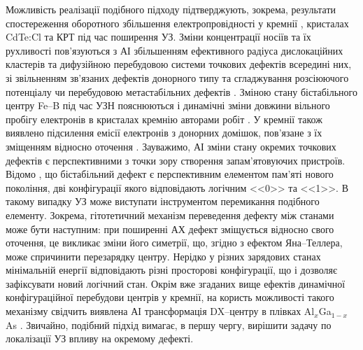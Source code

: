 Можливість реалізації подібного підходу підтверджують, зокрема, результати спостереження оборотного
збільшення електропровідності у кремнії \cite{YOlikhTPL2011r}, кристалах CdTe:Cl \cite{YOlikh:UFG2016,YOlikh:SupMicr} та КРТ \cite{OlikhYFTP99,OlikhYFTP2000} під час поширення УЗ.
Зміни концентрації носіїв та їх рухливості пов'язуються з АІ
збільшенням ефективного радіуса дислокаційних кластерів та дифузійною перебудовою системи точкових дефектів всередині них\cite{YOlikh:UFG2016,YOlikh:SupMicr},
зі звільненням зв'язаних дефектів донорного типу та сгладжування розсіюючого потенціалу \cite{OlikhYFTP99,OlikhYFTP2000}
чи перебудовою метастабільних дефектів \cite{YOlikhTPL2011r}.
Зміною стану бістабільного центру Fe--B під час УЗН пояснюються і динамічні зміни довжини вільного пробігу електронів в кристалах кремнію авторами робіт \cite{Ostrovskii2001,OlikhFTT}.
У кремнії також виявлено підсилення емісії електронів з донорних домішок, пов'язане з їх зміщенням відносно оточення \cite{Korotchenkov1995}.
Зауважимо, АІ зміни стану окремих точкових дефектів є перспективними з точки зору створення запам'ятовуючих пристроїв.
Відомо \cite{MetaUFN}, що бістабільний дефект є перспективним елементом пам'яті нового покоління,
дві конфігурації якого відповідають логічним <<0>> та <<1>>.
В такому випадку УЗ може виступати інструментом перемикання подібного елементу.
Зокрема, гітотетичний механізм переведення дефекту між станами може бути наступним:
при поширенні АХ дефект зміщується відносно свого оточення, це викликає зміни його симетрії, що, згідно з ефектом Яна--Теллера, може спричинити перезарядку центру.
Нерідко у різних зарядових станах мінімальній енергії відповідають різні просторові конфігурації, що і дозволяє зафіксувати новий логічний стан.
Окрім вже згаданих вище ефектів динамічної конфігураційної перебудови центрів у кремнії, на користь
можливості такого механізму свідчить виявлена АІ трансформація DX--центру в плівках Al$_x$Ga$_{1-x}$As \cite{belyaev1994}.
Звичайно, подібний підхід вимагає, в першу чергу, вирішити задачу по локалізації УЗ впливу на окремому дефекті.

